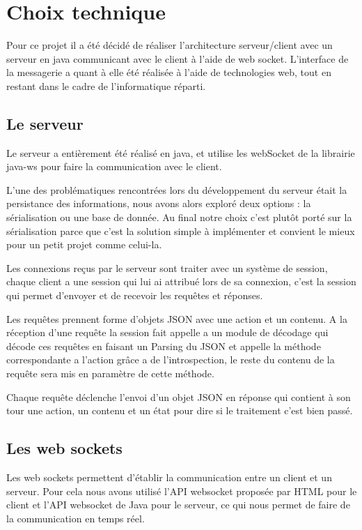 \section{Choix technique}

\par Pour ce projet il a été décidé de réaliser l'architecture serveur/client avec un serveur en java communicant avec le client à l'aide de web socket. L’interface de la messagerie a quant à elle été réalisée à l'aide de technologies web, tout en restant dans le cadre de l'informatique réparti. 

\subsection{Le serveur}
\par Le serveur a entièrement été réalisé en java, et utilise les webSocket de la librairie java-ws pour faire la communication avec le client.
\par L'une des problématiques rencontrées lors du développement du serveur était la persistance des informations, nous avons alors exploré deux options : la sérialisation ou une base de donnée.
Au final notre choix c'est plutôt porté sur la sérialisation parce que c'est la solution simple à implémenter et convient le mieux pour un petit projet comme celui-la.
\par Les connexions reçus par le serveur sont traiter avec un système de session, chaque client a une session qui lui ai attribué lors de sa connexion, c'est la session qui permet d'envoyer et de recevoir les requêtes et réponses.
\par Les requêtes prennent forme d'objets JSON avec une action et un contenu. A la réception d'une requête la session fait appelle a un module de décodage qui décode ces requêtes en faisant un Parsing du JSON et appelle la méthode correspondante a l'action grâce a de l'introspection, le reste du contenu de la requête sera mis en paramètre de cette méthode.
\par Chaque requête déclenche l'envoi d'un objet JSON en réponse qui contient à son tour une action, un contenu et un état pour dire si le traitement c'est bien passé.

\subsection{Les web sockets}
\par Les web sockets permettent d'établir la communication entre un client et un serveur. Pour cela nous avons utilisé l'API websocket proposée par HTML pour le client 
et l'API websocket de Java pour le serveur, ce qui nous permet de faire de la communication en temps réel.

